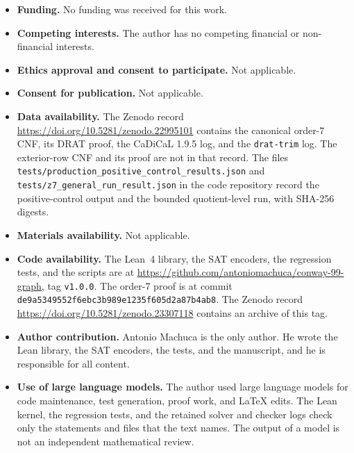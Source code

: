 \documentclass[pdflatex,sn-mathphys-num]{sn-jnl}
\theoremstyle{thmstyleone}
\theoremstyle{thmstyletwo}
\theoremstyle{thmstylethree}
\numberwithin{equation}{section}
\begin{document}
\begin{itemize}
\item \textbf{Funding.} No funding was received for this work.
\item \textbf{Competing interests.} The author has no competing financial or non-financial interests.
\item \textbf{Ethics approval and consent to participate.} Not applicable.
\item \textbf{Consent for publication.} Not applicable.
\item \textbf{Data availability.} The Zenodo record \url{https://doi.org/10.5281/zenodo.22995101} contains the canonical order-7 CNF, its DRAT proof, the CaDiCaL 1.9.5 log, and the \texttt{drat-trim} log. The exterior-row CNF and its proof are not in that record. The files \texttt{tests/production\_positive\_control\_results.json} and \texttt{tests/z7\_general\_run\_result.json} in the code repository record the positive-control output and the bounded quotient-level run, with SHA-256 digests.
\item \textbf{Materials availability.} Not applicable.
\item \textbf{Code availability.} The Lean~4 library, the SAT encoders, the regression tests, and the scripts are at \url{https://github.com/antoniomachuca/conway-99-graph}, tag \texttt{v1.0.0}. The order-7 proof is at commit \texttt{de9a5349552f6ebc3b989e1235f605d2a87b4ab8}. The Zenodo record \url{https://doi.org/10.5281/zenodo.23307118} contains an archive of this tag.
\item \textbf{Author contribution.} Antonio Machuca is the only author. He wrote the Lean library, the SAT encoders, the tests, and the manuscript, and he is responsible for all content.
\item \textbf{Use of large language models.} The author used large language models for code maintenance, test generation, proof work, and LaTeX edits. The Lean kernel, the regression tests, and the retained solver and checker logs check only the statements and files that the text names. The output of a model is not an independent mathematical review.
\end{itemize}


\end{document}
